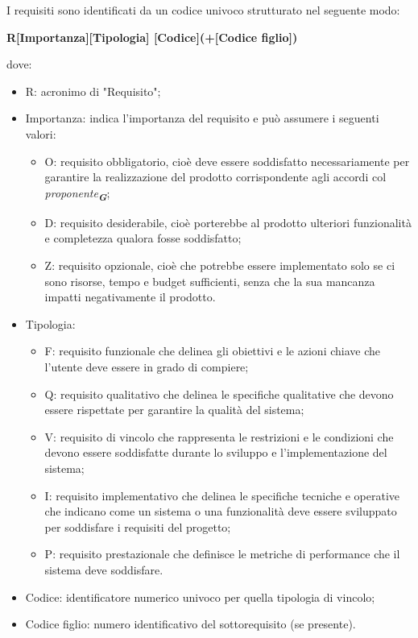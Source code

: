 I requisiti sono identificati da un codice univoco strutturato nel seguente modo:\\
\begin{center}
    \textbf{R[Importanza][Tipologia] [Codice](+[Codice figlio])}
\end{center}
dove:
\begin{itemize}
    \item R: acronimo di "Requisito";
    \item Importanza: indica l’importanza del requisito e può assumere i seguenti valori:
    \begin{itemize}
        \item O: requisito obbligatorio, cioè deve essere soddisfatto necessariamente per garantire la realizzazione del prodotto corrispondente agli accordi col \emph{proponente}\textsubscript{\textit{\textbf{G}}};
        \item D: requisito desiderabile, cioè porterebbe al prodotto ulteriori funzionalità e completezza qualora fosse soddisfatto;
        \item Z: requisito opzionale, cioè che potrebbe essere implementato solo se ci sono risorse, tempo e budget sufficienti, senza che la sua mancanza impatti negativamente il prodotto.
    \end{itemize}
    \item Tipologia:
        \begin{itemize} 
            \item F: requisito funzionale che delinea gli obiettivi e le azioni chiave che l’utente deve essere in grado di compiere;
            \item Q: requisito qualitativo che delinea le specifiche qualitative che devono essere rispettate per garantire la qualità del sistema;
            \item V: requisito di vincolo che rappresenta le restrizioni e le condizioni che devono essere soddisfatte durante lo sviluppo e l’implementazione del sistema;
            \item I: requisito implementativo che delinea le specifiche tecniche e operative che indicano come un sistema o una funzionalità deve essere sviluppato per soddisfare i requisiti del progetto;  
            \item P: requisito prestazionale che definisce le metriche di performance che il sistema deve soddisfare. 
        \end{itemize}
    \item Codice: identificatore numerico univoco per quella tipologia di vincolo;
    \item Codice figlio: numero identificativo del sottorequisito (se presente).
\end{itemize}

